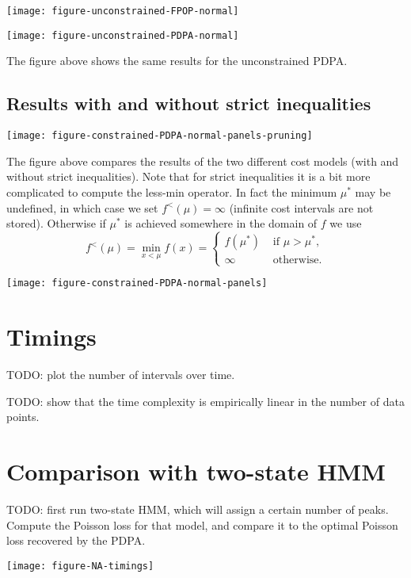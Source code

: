 \documentclass{article}
\begin{document}
\texttt{[image: figure-unconstrained-FPOP-normal]}

\texttt{[image: figure-unconstrained-PDPA-normal]}

The figure above shows the same results for the unconstrained PDPA.

\subsection{Results with and without strict inequalities}

\texttt{[image: figure-constrained-PDPA-normal-panels-pruning]}

The figure above compares the results of the two different cost models
(with and without strict inequalities). Note that for strict
inequalities it is a bit more complicated to compute the less-min
operator. In fact the minimum $\mu^*$ may be undefined, in which case
we set $f^{<}(\mu)=\infty$ (infinite cost intervals are not
stored). Otherwise if $\mu^*$ is achieved somewhere in the domain of
$f$ we use
\begin{equation*}
  f^{<}(\mu) = \min_{x<\mu}f(x) = 
  \begin{cases}
    f(\mu^*) & \text{ if } \mu > \mu^*,\\
    \infty & \text{ otherwise.}
  \end{cases}
\end{equation*}


\texttt{[image: figure-constrained-PDPA-normal-panels]}

\section{Timings}

TODO: plot the number of intervals over time.

TODO: show that the time complexity is empirically linear in the
number of data points.

\section{Comparison with two-state HMM}

TODO: first run two-state HMM, which will assign a certain number of
peaks. Compute the Poisson loss for that model, and compare it to the
optimal Poisson loss recovered by the PDPA.

\texttt{[image: figure-NA-timings]}



\end{document}
